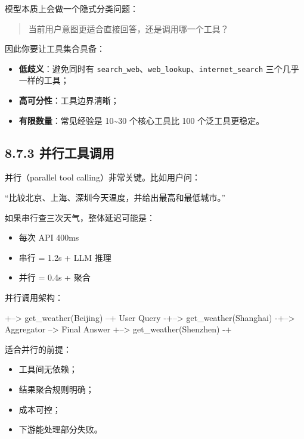 模型本质上会做一个隐式分类问题：


\begin{quote}
当前用户意图更适合直接回答，还是调用哪一个工具？\\
\end{quote}

因此你要让工具集合具备：


\begin{itemize}[leftmargin=2em]
\item \textbf{低歧义}：避免同时有 \texttt{search\_web}、\texttt{web\_lookup}、\texttt{internet\_search} 三个几乎一样的工具；
\item \textbf{高可分性}：工具边界清晰；
\item \textbf{有限数量}：常见经验是 10\textasciitilde{}30 个核心工具比 100 个泛工具更稳定。
\end{itemize}

\subsection{8.7.3 并行工具调用}

并行（parallel tool calling）非常关键。比如用户问：


``比较北京、上海、深圳今天温度，并给出最高和最低城市。''


如果串行查三次天气，整体延迟可能是：


\begin{itemize}[leftmargin=2em]
\item 每次 API 400ms
\item 串行 = 1.2s + LLM 推理
\item 并行 = 0.4s + 聚合
\end{itemize}

并行调用架构：


\begin{codeblock}
            +--> get_weather(Beijing) --+
User Query -+--> get_weather(Shanghai) -+--> Aggregator --> Final Answer
            +--> get_weather(Shenzhen) -+
\end{codeblock}

适合并行的前提：


\begin{itemize}[leftmargin=2em]
\item 工具间无依赖；
\item 结果聚合规则明确；
\item 成本可控；
\item 下游能处理部分失败。
\end{itemize}

